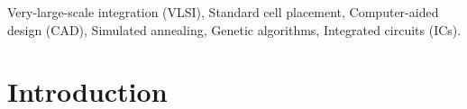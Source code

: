 \documentclass[conference]{IEEEtran}
\begin{document}

\begin{IEEEkeywords}

Very-large-scale integration (VLSI), Standard cell placement, Computer-aided design (CAD), Simulated annealing, Genetic algorithms, Integrated circuits (ICs).

\end{IEEEkeywords}


\section{Introduction}
\end{document}
